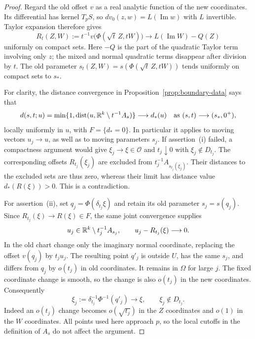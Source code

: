 \begin{proof}
Regard the old offset $v$ as a real analytic function of the new
coordinates.  Its differential has kernel $T_pS$, so
$dv_0(z,w)=L(\operatorname{Im}w)$ with $L$ invertible.  Taylor expansion
therefore gives
\begin{equation}
\label{eq:residual-scaling}
 R_t(Z,W):=t^{-1}v\bigl(\Phi(\sqrt t\,Z,tW)\bigr)
 \longrightarrow L(\operatorname{Im}W)-Q(Z)
\end{equation}
uniformly on compact sets.  Here $-Q$ is the part of the quadratic Taylor
term involving only $z$; the mixed and normal quadratic terms disappear
after division by $t$.  The old parameter
$s_t(Z,W)=s(\Phi(\sqrt t\,Z,tW))$ tends uniformly on compact sets to
$s_*$.

For clarity, the distance convergence in
Proposition~\ref{prop:boundary-data} says that
\[
 d(s,t;u)=\min\{1,\operatorname{dist}
       (u,\mathbb R^k\setminus t^{-1}A_s)\}
 \longrightarrow d_*(u)
 \quad\text{as }(s,t)\longrightarrow(s_*,0^+),
\]
locally uniformly in $u$, with $F=\{d_*=0\}$.  In particular it applies
to moving vectors $u_j\to u$, as well as to moving parameters $s_j$.
If assertion~\textup{(i)} failed, a compactness argument would give
$\xi_j\to\xi\in\mathcal O$ and $t_j\downarrow0$ with
$\xi_j\notin D_{t_j}$.  The corresponding offsets
$R_{t_j}(\xi_j)$ are excluded from $t_j^{-1}A_{s_{t_j}(\xi_j)}$.
Their distances to the excluded sets are thus zero, whereas their limit
has distance value $d_*(R(\xi))>0$.  This is a contradiction.

For assertion~\textup{(ii)}, set $q_j=\Phi(\delta_{t_j}\xi)$ and retain
its old parameter $s_j=s(q_j)$.  Since $R_{t_j}(\xi)\to R(\xi)\in F$,
the same joint convergence supplies
\[
 u_j\in\mathbb R^k\setminus t_j^{-1}A_{s_j},
 \qquad u_j-R_{t_j}(\xi)\longrightarrow0.
\]
In the old chart change only the imaginary normal coordinate, replacing
the offset $v(q_j)$ by $t_ju_j$.  The resulting point $q'_j$ is outside
$U$, has the same $s_j$, and differs from $q_j$ by $o(t_j)$ in old
coordinates.  It remains in $\Omega$ for large $j$.  The fixed coordinate
change is smooth, so the change is also $o(t_j)$ in the new coordinates.
Consequently
\[
 \xi_j:=\delta_{t_j}^{-1}\Phi^{-1}(q'_j)
 \longrightarrow\xi,
 \qquad \xi_j\notin D_{t_j}.
\]
Indeed an $o(t_j)$ change becomes $o(\sqrt{t_j})$ in the $Z$ coordinates
and $o(1)$ in the $W$ coordinates.  All points used here approach $p$,
so the local cutoffs in the definition of $A_s$ do not affect the argument.
\end{proof}

